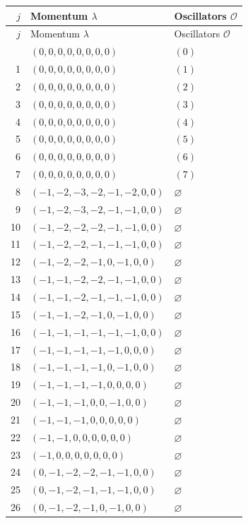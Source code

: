 \begingroup\scriptsize
\setlength{\tabcolsep}{5pt}
\begin{longtable}{@{}rll@{}}
\toprule
$j$ & Momentum $\lambda$ & Oscillators $\mathcal O$\\
\midrule\endfirsthead
\toprule
$j$ & Momentum $\lambda$ & Oscillators $\mathcal O$\\
\midrule\endhead
\bottomrule\endfoot
0 & $(0,0,0,0,0,0,0,0)$ & $(0)$\\
1 & $(0,0,0,0,0,0,0,0)$ & $(1)$\\
2 & $(0,0,0,0,0,0,0,0)$ & $(2)$\\
3 & $(0,0,0,0,0,0,0,0)$ & $(3)$\\
4 & $(0,0,0,0,0,0,0,0)$ & $(4)$\\
5 & $(0,0,0,0,0,0,0,0)$ & $(5)$\\
6 & $(0,0,0,0,0,0,0,0)$ & $(6)$\\
7 & $(0,0,0,0,0,0,0,0)$ & $(7)$\\
8 & $(-1,-2,-3,-2,-1,-2,0,0)$ & $\varnothing$\\
9 & $(-1,-2,-3,-2,-1,-1,0,0)$ & $\varnothing$\\
10 & $(-1,-2,-2,-2,-1,-1,0,0)$ & $\varnothing$\\
11 & $(-1,-2,-2,-1,-1,-1,0,0)$ & $\varnothing$\\
12 & $(-1,-2,-2,-1,0,-1,0,0)$ & $\varnothing$\\
13 & $(-1,-1,-2,-2,-1,-1,0,0)$ & $\varnothing$\\
14 & $(-1,-1,-2,-1,-1,-1,0,0)$ & $\varnothing$\\
15 & $(-1,-1,-2,-1,0,-1,0,0)$ & $\varnothing$\\
16 & $(-1,-1,-1,-1,-1,-1,0,0)$ & $\varnothing$\\
17 & $(-1,-1,-1,-1,-1,0,0,0)$ & $\varnothing$\\
18 & $(-1,-1,-1,-1,0,-1,0,0)$ & $\varnothing$\\
19 & $(-1,-1,-1,-1,0,0,0,0)$ & $\varnothing$\\
20 & $(-1,-1,-1,0,0,-1,0,0)$ & $\varnothing$\\
21 & $(-1,-1,-1,0,0,0,0,0)$ & $\varnothing$\\
22 & $(-1,-1,0,0,0,0,0,0)$ & $\varnothing$\\
23 & $(-1,0,0,0,0,0,0,0)$ & $\varnothing$\\
24 & $(0,-1,-2,-2,-1,-1,0,0)$ & $\varnothing$\\
25 & $(0,-1,-2,-1,-1,-1,0,0)$ & $\varnothing$\\
26 & $(0,-1,-2,-1,0,-1,0,0)$ & $\varnothing$\\

\end{longtable}
